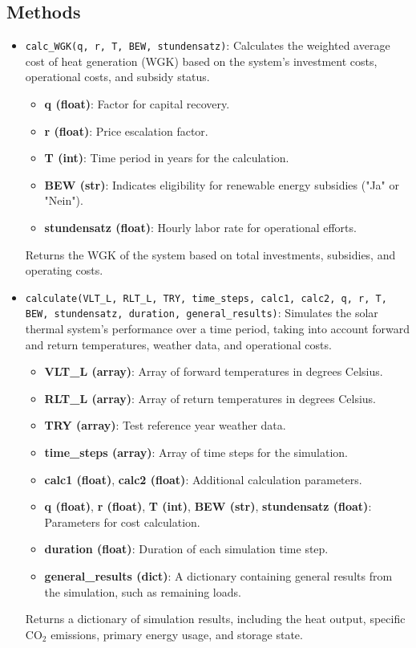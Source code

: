 \subsection{Methods}
\begin{itemize}
    \item \texttt{calc\_WGK(q, r, T, BEW, stundensatz)}: Calculates the weighted average cost of heat generation (WGK) based on the system's investment costs, operational costs, and subsidy status. 
    \begin{itemize}
        \item \textbf{q (float)}: Factor for capital recovery.
        \item \textbf{r (float)}: Price escalation factor.
        \item \textbf{T (int)}: Time period in years for the calculation.
        \item \textbf{BEW (str)}: Indicates eligibility for renewable energy subsidies ("Ja" or "Nein").
        \item \textbf{stundensatz (float)}: Hourly labor rate for operational efforts.
    \end{itemize}
    Returns the WGK of the system based on total investments, subsidies, and operating costs.

    \item \texttt{calculate(VLT\_L, RLT\_L, TRY, time\_steps, calc1, calc2, q, r, T, BEW, stundensatz, duration, general\_results)}: 
    Simulates the solar thermal system's performance over a time period, taking into account forward and return temperatures, weather data, and operational costs. 
    \begin{itemize}
        \item \textbf{VLT\_L (array)}: Array of forward temperatures in degrees Celsius.
        \item \textbf{RLT\_L (array)}: Array of return temperatures in degrees Celsius.
        \item \textbf{TRY (array)}: Test reference year weather data.
        \item \textbf{time\_steps (array)}: Array of time steps for the simulation.
        \item \textbf{calc1 (float)}, \textbf{calc2 (float)}: Additional calculation parameters.
        \item \textbf{q (float)}, \textbf{r (float)}, \textbf{T (int)}, \textbf{BEW (str)}, \textbf{stundensatz (float)}: Parameters for cost calculation.
        \item \textbf{duration (float)}: Duration of each simulation time step.
        \item \textbf{general\_results (dict)}: A dictionary containing general results from the simulation, such as remaining loads.
    \end{itemize}
    Returns a dictionary of simulation results, including the heat output, specific CO$_2$ emissions, primary energy usage, and storage state.


\end{itemize}
